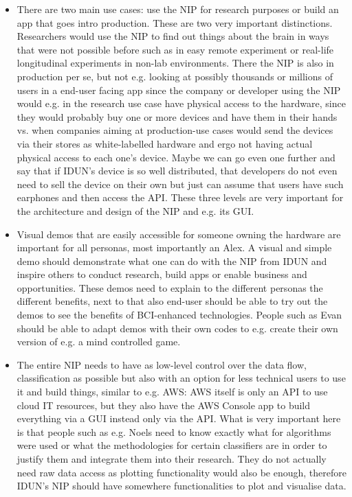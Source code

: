 \begin{itemize}
  \item There are two main use cases: use the NIP for research purposes or build an app that goes intro production. These are two very important distinctions. Researchers would use the NIP to find out things about the brain in ways that were not possible before such as in easy remote experiment or real-life longitudinal experiments in non-lab environments. There the NIP is also in production per se, but not e.g. looking at possibly thousands or millions of users in a end-user facing app since the company or developer using the NIP would e.g. in the research use case have physical access to the hardware, since they would probably buy one or more devices and have them in their hands vs. when companies aiming at production-use cases would send the devices via their stores as white-labelled hardware and ergo not having actual physical access to each one's device. Maybe we can go even one further and say that if IDUN's device is so well distributed, that developers do not even need to sell the device on their own but just can assume that users have such earphones and then access the API. These three levels are very important for the architecture and design of the NIP and e.g. its GUI.
  \item Visual demos that are easily accessible for someone owning the hardware are important for all personas, most importantly an Alex. A visual and simple demo should demonstrate what one can do with the NIP from IDUN and inspire others to conduct research, build apps or enable business and opportunities. These demos need to explain to the different personas the different benefits, next to that also end-user should be able to try out the demos to see the benefits of BCI-enhanced technologies. People such as Evan should be able to adapt demos with their own codes to e.g. create their own version of e.g. a mind controlled game.
  \item The entire NIP needs to have as low-level control over the data flow, classification as possible but also with an option for less technical users to use it and build things, similar to e.g. AWS: AWS itself is only an API to use cloud IT resources, but they also have the AWS Console app to build everything via a GUI instead only via the API. What is very important here is that people such as e.g. Noels need to know exactly what for algorithms were used or what the methodologies for certain classifiers are in order to justify them and integrate them into their research. They do not actually need raw data access as plotting functionality would also be enough, therefore IDUN's NIP should have somewhere functionalities to plot and visualise data.

\end{itemize}
